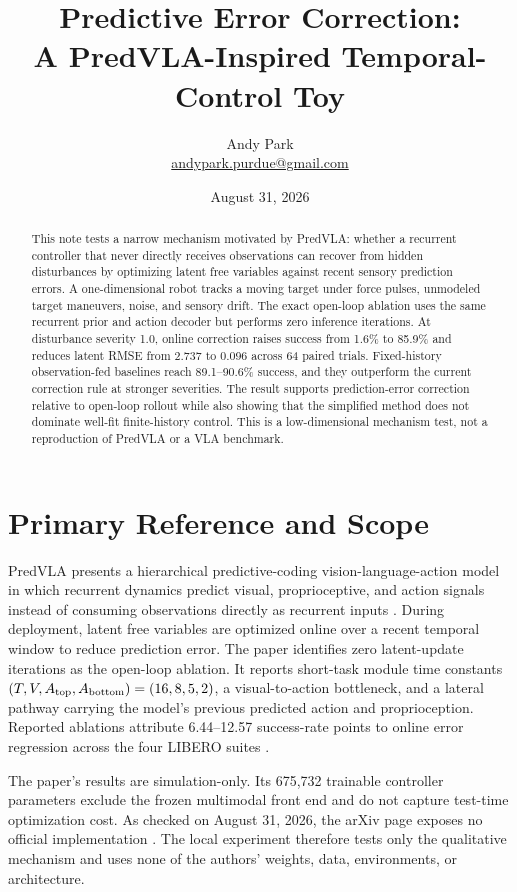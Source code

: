 \documentclass[11pt]{article}
\title{Predictive Error Correction:\\A PredVLA-Inspired Temporal-Control Toy}
\author{Andy Park\\\href{mailto:andypark.purdue@gmail.com}{andypark.purdue@gmail.com}}
\date{August 31, 2026}
\begin{document}
\setlength{\emergencystretch}{3em}
\maketitle

\begin{abstract}
This note tests a narrow mechanism motivated by PredVLA: whether a recurrent controller that never directly receives observations can recover from hidden disturbances by optimizing latent free variables against recent sensory prediction errors. A one-dimensional robot tracks a moving target under force pulses, unmodeled target maneuvers, noise, and sensory drift. The exact open-loop ablation uses the same recurrent prior and action decoder but performs zero inference iterations. At disturbance severity 1.0, online correction raises success from 1.6\% to 85.9\% and reduces latent RMSE from 2.737 to 0.096 across 64 paired trials. Fixed-history observation-fed baselines reach 89.1--90.6\% success, and they outperform the current correction rule at stronger severities. The result supports prediction-error correction relative to open-loop rollout while also showing that the simplified method does not dominate well-fit finite-history control. This is a low-dimensional mechanism test, not a reproduction of PredVLA or a VLA benchmark.
\end{abstract}

\section{Primary Reference and Scope}

PredVLA presents a hierarchical predictive-coding vision-language-action model in which recurrent dynamics predict visual, proprioceptive, and action signals instead of consuming observations directly as recurrent inputs \cite{predvla}. During deployment, latent free variables are optimized online over a recent temporal window to reduce prediction error. The paper identifies zero latent-update iterations as the open-loop ablation. It reports short-task module time constants $(T,V,A_{\rm top},A_{\rm bottom})=(16,8,5,2)$, a visual-to-action bottleneck, and a lateral pathway carrying the model's previous predicted action and proprioception. Reported ablations attribute 6.44--12.57 success-rate points to online error regression across the four LIBERO suites \cite{predvla}.

The paper's results are simulation-only. Its 675,732 trainable controller parameters exclude the frozen multimodal front end and do not capture test-time optimization cost. As checked on August 31, 2026, the arXiv page exposes no official implementation \cite{predvla}. The local experiment therefore tests only the qualitative mechanism and uses none of the authors' weights, data, environments, or architecture.
\end{document}
